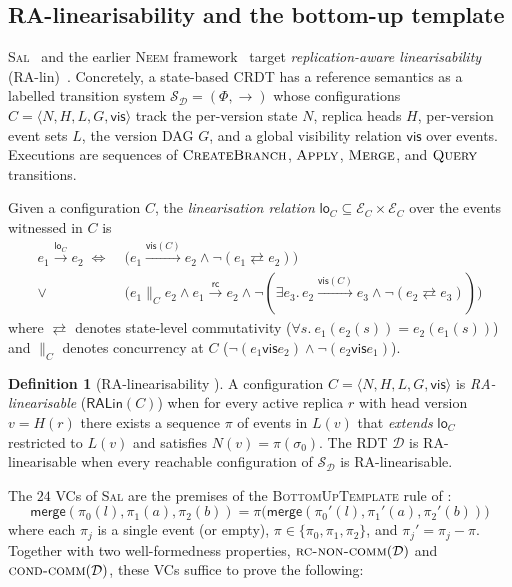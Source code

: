 \documentclass[11pt,a4paper]{article}
\theoremstyle{definition}
\newtheorem{definition}[theorem]{Definition}
\theoremstyle{remark}
\newcommand{\RDT}{\ensuremath{\mathcal{D}}}
\newcommand{\mmerge}{\mathsf{merge}}
\newcommand{\mrc}{\mathsf{rc}}
\newcommand{\mvis}{\mathsf{vis}}
\newcommand{\mlo}{\mathsf{lo}}
\newcommand{\evs}{\mathcal{E}}
\newcommand{\init}{\sigma_0}
\newcommand{\commute}{\mathrel{\rightleftarrows}}
\newcommand{\RALin}{\mathsf{RALin}}
\newcommand{\Sal}{\textsc{Sal}}
\begin{document}
\subsection{RA-linearisability and the bottom-up template}

\Sal{}~\cite{sal2025} and the earlier \textsc{Neem}
framework~\cite{neem2025} target \emph{replication-aware
linearisability} (RA-lin)~\cite{wang-ra-lin}. Concretely, a
state-based CRDT has a reference semantics as a labelled transition
system $\mathcal{S}_\RDT = (\Phi, \to)$ whose configurations
$C = \langle N, H, L, G, \mvis\rangle$ track the per-version state
$N$, replica heads $H$, per-version event sets $L$, the version DAG
$G$, and a global visibility relation $\mvis$ over events. Executions
are sequences of $\textsc{CreateBranch}$, $\textsc{Apply}$,
$\textsc{Merge}$, and $\textsc{Query}$ transitions.

Given a configuration $C$, the \emph{linearisation relation}
$\mlo_C \subseteq \evs_C \times \evs_C$ over the events witnessed in
$C$ is
\begin{equation}
\label{eq:lo}
\begin{aligned}
e_1 \xrightarrow{\mlo_C} e_2
\;\iff\;
& \bigl(e_1 \xrightarrow{\mvis(C)} e_2 \wedge \neg (e_1 \commute e_2)\bigr) \\
\vee \; & \bigl(e_1 \mathbin{\|}_C e_2
   \wedge e_1 \xrightarrow{\mrc} e_2
   \wedge \neg (\exists e_3.\, e_2 \xrightarrow{\mvis(C)} e_3 \wedge \neg (e_2 \commute e_3)) \bigr)
\end{aligned}
\end{equation}
where $\commute$ denotes state-level commutativity
($\forall s.\ e_1(e_2(s)) = e_2(e_1(s))$) and $\mathbin{\|}_C$
denotes concurrency at $C$ ($\neg(e_1 \mvis e_2) \wedge \neg(e_2 \mvis e_1)$).

\begin{definition}[RA-linearisability \cite{sal2025}]
\label{def:ralin}
A configuration $C = \langle N, H, L, G, \mvis\rangle$ is
\emph{RA-linearisable} ($\RALin(C)$) when for every active replica
$r$ with head version $v = H(r)$ there exists a sequence $\pi$ of
events in $L(v)$ that \emph{extends} $\mlo_C$ restricted to $L(v)$
and satisfies $N(v) = \pi(\init)$. The RDT $\RDT$ is
RA-linearisable when every reachable configuration of
$\mathcal{S}_\RDT$ is RA-linearisable.
\end{definition}

The $24$ VCs of \Sal{} are the premises of the
\textsc{BottomUpTemplate} rule of \cite{sal2025}:
\begin{equation}
\label{eq:bottom-up-template}
  \mmerge(\pi_0(l), \pi_1(a), \pi_2(b))
  = \pi\bigl(\mmerge(\pi_0'(l), \pi_1'(a), \pi_2'(b))\bigr)
\end{equation}
where each $\pi_j$ is a single event (or empty), $\pi \in
\{\pi_0, \pi_1, \pi_2\}$, and $\pi_j' = \pi_j - \pi$. Together with
two well-formedness properties, $\textsc{rc-non-comm}(\RDT)$ and
$\textsc{cond-comm}(\RDT)$, these VCs suffice to prove the
following:
\end{document}
